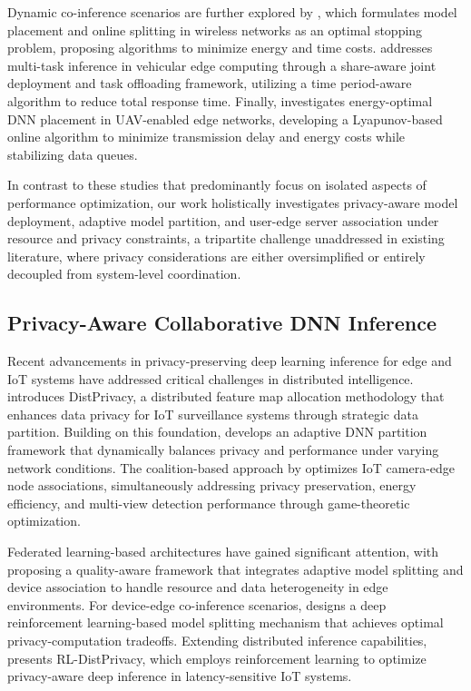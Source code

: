 Dynamic co-inference scenarios are further explored by \cite{c32}, which formulates model placement and online splitting in wireless networks as an optimal stopping problem, proposing algorithms to minimize energy and time costs. \cite{c33} addresses multi-task inference in vehicular edge computing through a share-aware joint deployment and task offloading framework, utilizing a time period-aware algorithm to reduce total response time. Finally, \cite{c34} investigates energy-optimal DNN placement in UAV-enabled edge networks, developing a Lyapunov-based online algorithm to minimize transmission delay and energy costs while stabilizing data queues.

In contrast to these studies that predominantly focus on isolated aspects of performance optimization, our work holistically investigates privacy-aware model deployment, adaptive model partition, and user-edge server association under resource and privacy constraints, a tripartite challenge unaddressed in existing literature, where privacy considerations are either oversimplified or entirely decoupled from system-level coordination.

\subsection{Privacy-Aware Collaborative DNN Inference}
Recent advancements in privacy-preserving deep learning inference for edge and IoT systems have addressed critical challenges in distributed intelligence. \cite{c35} introduces DistPrivacy, a distributed feature map allocation methodology that enhances data privacy for IoT surveillance systems through strategic data partition. Building on this foundation, \cite{c36} develops an adaptive DNN partition framework that dynamically balances privacy and performance under varying network conditions. The coalition-based approach by \cite{c37} optimizes IoT camera-edge node associations, simultaneously addressing privacy preservation, energy efficiency, and multi-view detection performance through game-theoretic optimization.

Federated learning-based architectures have gained significant attention, with \cite{c38} proposing a quality-aware framework that integrates adaptive model splitting and device association to handle resource and data heterogeneity in edge environments. For device-edge co-inference scenarios, \cite{c39} designs a deep reinforcement learning-based model splitting mechanism that achieves optimal privacy-computation tradeoffs. Extending distributed inference capabilities, \cite{c40} presents RL-DistPrivacy, which employs reinforcement learning to optimize privacy-aware deep inference in latency-sensitive IoT systems.

